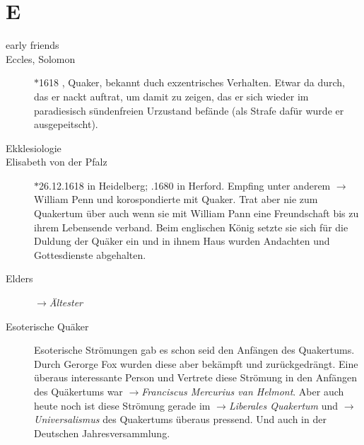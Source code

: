 \section*{E}

\articlesize

\begin{description}

 \item[early friends] 

 \item[Eccles, Solomon] $\ast$1618 , Quaker,  bekannt duch exzentrisches
 Verhalten. Etwar da durch, das er nackt auftrat, um damit zu zeigen, das er
 sich wieder im paradiesisch sündenfreien Urzustand befände (als Strafe dafür
 wurde er ausgepeitscht).

 \item[Ekklesiologie]


 \item[Elisabeth von der Pfalz] $\ast$26.12.1618 in Heidelberg; .1680
 in Herford. Empfing unter anderem $\to$William Penn und korospondierte mit
 Quaker. Trat aber nie zum Quakertum über auch wenn sie mit William Pann eine
 Freundschaft bis zu ihrem Lebensende verband. Beim englischen König setzte sie
 sich für die Duldung der Quäker ein und in ihnem Haus wurden Andachten und
 Gottesdienste abgehalten.

  \item[Elders] $\to$\textit{Ältester}

  \item[Esoterische Quäker] Esoterische Strömungen gab es schon seid den Anfängen
  des Quakertums. Durch Gerorge Fox wurden diese aber bekämpft und zurückgedrängt.
  Eine überaus interessante Person und Vertrete diese Strömung in den Anfängen
  des Quäkertums war $\to$\textit{Franciscus Mercurius van Helmont}. Aber auch
  heute noch ist diese Strömung gerade im $\to$\textit{Liberales Quakertum} und
  $\to$\textit{Universalismus} des Quakertums überaus pressend. Und auch in der
  Deutschen Jahresversammlung.


\end{description}
